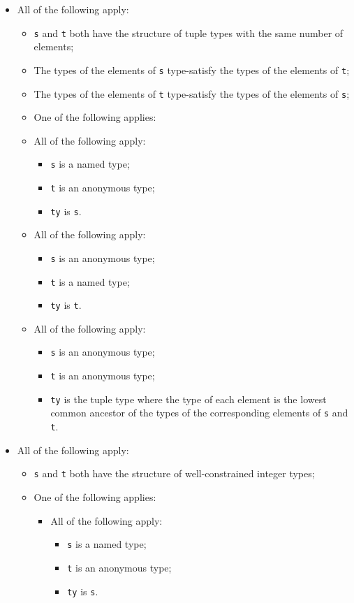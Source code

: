 \documentclass{book}
\begin{document}
\begin{itemize}
  \item All of the following apply:
    \begin{itemize}
    \item \texttt{s} and \texttt{t} both have the structure of tuple types with the same number of elements;
    \item The types of the elements of \texttt{s} type-satisfy the types of the elements of \texttt{t};
    \item The types of the elements of \texttt{t} type-satisfy the types of the elements of \texttt{s};
    \item One of the following applies:

      \item All of the following apply:
        \begin{itemize}
        \item \texttt{s} is a named type;
        \item \texttt{t} is an anonymous type;
        \item \texttt{ty} is \texttt{s}.
        \end{itemize}

      \item All of the following apply:
        \begin{itemize}
        \item \texttt{s} is an anonymous type;
        \item \texttt{t} is a named type;
        \item \texttt{ty} is \texttt{t}.
        \end{itemize}

     \item All of the following apply:
        \begin{itemize}
        \item \texttt{s} is an anonymous type;
        \item \texttt{t} is an anonymous type;
	\item \texttt{ty} is the tuple type where the type of each element is the lowest common
	  ancestor of the types of the corresponding elements of \texttt{s} and \texttt{t}. 
        \end{itemize}
    \end{itemize}

  \item All of the following apply:
    \begin{itemize}
    \item \texttt{s} and \texttt{t} both have the structure of well-constrained integer types;
    \item One of the following applies:
      \begin{itemize}
      \item All of the following apply:
        \begin{itemize}
        \item \texttt{s} is a named type;
        \item \texttt{t} is an anonymous type;
        \item \texttt{ty} is \texttt{s}.
        \end{itemize}


\end{itemize}
\end{itemize}
\end{itemize}
\end{document}
